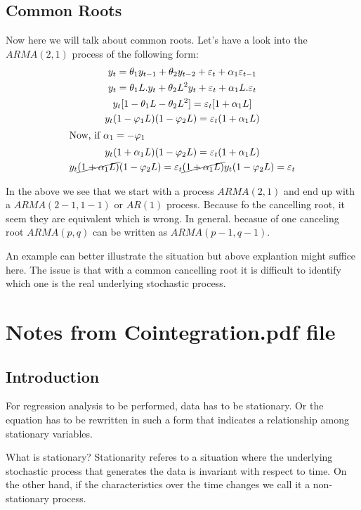 \documentclass{book}
\begin{document}
\subsection{Common Roots}   
Now here we will talk about common roots. Let's have a look into the $ARMA(2,1)$ process of the following form: 
\begin{gather} \label{}
	y_t=\theta_1 y_{t-1}+\theta_2 y_{t-2}+ \varepsilon_t + \alpha_1 \varepsilon_{t-1} \\
	y_t=\theta_1 L.y_t+\theta_2 L^2 y_t+\varepsilon_t+\alpha_1 L.\varepsilon_t \\
	y_t[1-\theta_1 L -\theta_2 L^2]=\varepsilon_t[1+\alpha_1 L]\\
	y_t(1-\varphi_1L)(1-\varphi_2 L)=\varepsilon_t(1+\alpha_1 L)\\
	\intertext{Now, if $\alpha_1=-\varphi_1$}
	y_t(1+\alpha_1 L)(1-\varphi_2 L)=\varepsilon_t(1+\alpha_1 L)\\
	y_t \cancel{(1+\alpha_1 L)}(1-\varphi_2 L)=\varepsilon_t\cancel{(1+\alpha_1 L)}
	y_t(1-\varphi_2 L)=\varepsilon_t
\end{gather}

In the above we see that we start with a process $ARMA(2,1)$ and end up with a $ARMA(2-1,1-1)$ or $AR(1)$ process. Because fo the cancelling root, it seem they are equivalent which is wrong. In general. becasue of one canceling root $ARMA(p,q)$ can be written as $ARMA(p-1, q-1)$. 

An example can better illustrate the situation but above explantion might suffice here. The issue is that with a common cancelling root it is difficult to identify which one is the real underlying stochastic process. 

\section{Notes from Cointegration.pdf file }
\subsection{Introduction}
For regression analysis to be performed, data has to be stationary. Or the equation has to be rewritten in such a form that indicates a relationship among stationary variables. 

What is stationary? Stationarity referes to a situation where the underlying stochastic process that generates the data is invariant with respect to time. On the other hand, if the characteristics over the time changes we call it a non-stationary process. 
\end{document}
